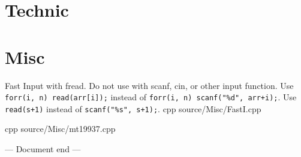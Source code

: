 \documentclass[portrait, 8pt, a4paper, oneside, twocolumn]{extarticle}
\begin{document}
\section{Technic}


\section{Misc}

{Fast Input with fread. Do not use with scanf, cin, or other input function. Use \texttt{forr(i, n) read(arr[i]);} instead of \texttt{forr(i, n) scanf("\%d", arr+i);}. Use \texttt{read(s+1)} instead of \texttt{scanf("\%s", s+1);}.}
{}
{cpp}
{source/Misc/FastI.cpp}

{}
{}
{cpp}
{source/Misc/mt19937.cpp}


\begin{center}
\bigskip
--- Document end ---
\end{center}
\end{document}
